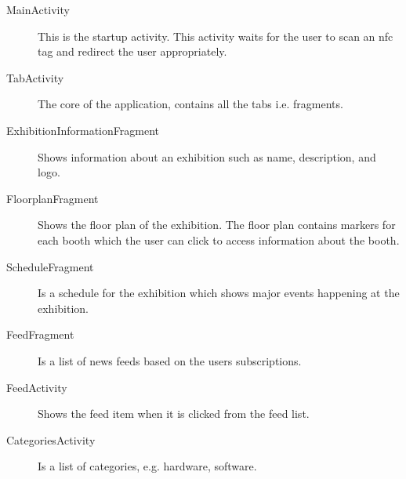 \begin{description}
\item[MainActivity] This is the startup activity. This activity waits for the user to scan an \ac{nfc} tag and redirect the user appropriately.
\item[TabActivity] The core of the application, contains all the tabs i.e. fragments.
\item[ExhibitionInformationFragment] Shows information about an exhibition such as name, description, and logo.
\item[FloorplanFragment] Shows the floor plan of the exhibition. The floor plan contains markers for each booth which the user can click to access information about the booth.
\item[ScheduleFragment] Is a schedule for the exhibition which shows major events happening at the exhibition.
\item[FeedFragment] Is a list of news feeds based on the users subscriptions.
\item[FeedActivity] Shows the feed item when it is clicked from the feed list.
\item[CategoriesActivity] Is a list of categories, e.g. hardware, software.
\end{description}

